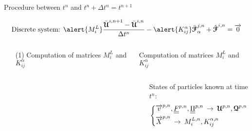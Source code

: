 \begin{frame}{Procedure between $t^n$ and $t^n + \Delta t^n=t^{n+1}$}
  \begin{footnotesize}
    \begin{equation*}
      \text{Discrete system: }\alert{M^L_{i}} \frac{\bar{\Ucb}^{i,n+1} - \bar{\Ucb}^{i,n}}{\Delta t^n}  - \alert{K_{ij}^\alpha} \bar{\Fcb}^{j,n}_{\alpha}  + \hat{\Fcb}^{i,n}=  \vect{0}
    \end{equation*}
    \begin{columns}
      \begin{column}{0.4\textwidth}
        \begin{itemize}
        \item[(1)] Computation of matrices $M_i^L$ and $K_{ij}^\alpha$
        \item[]
        \item[]
        \item[]
        \item[]
        \item[]
        \item[]
        \item[]
        \end{itemize}
      \end{column}
      \vrule{}
      \begin{column}{0.6\textwidth}
        \begin{block}{Computation of matrices $M_i^L$ and $K_{ij}^\alpha$}
          \begin{columns}
            \begin{column}{0.3\textwidth}
              \vskip 0.9pt
            \end{column}
            \begin{column}{0.6\textwidth}
              States of particles known at time $t^n$:
              \begin{equation*}
                \left\lbrace\begin{aligned}
                    & {\overrightarrow{v}}^{p,n},{\underline{\underline{F}}}^{p,n},{\underline{\underline{\Pi}}}^{p,n} \: \rightarrow \:{\boldsymbol{\mathcal{U}}}^{p,n},{\boldsymbol{\mathcal{Q}}}^{p,n}\\
                    & {\overrightarrow{X}}^{p,n} \: \rightarrow \:M_i^{L,n},K_{ij}^{\alpha,n}
                  \end{aligned}\right.
              \end{equation*}
              

\end{column}
\end{columns}
\end{block}
\end{column}
\end{columns}
\end{footnotesize}
\end{frame}

